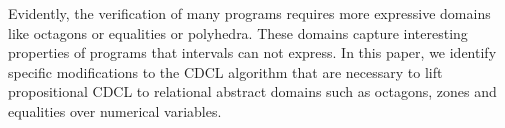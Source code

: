Evidently, the verification of many programs requires more expressive
domains like octagons or equalities or polyhedra.  These domains capture
interesting properties of programs that intervals can not express.  In this
paper, we identify specific modifications to the CDCL algorithm that are
necessary to lift propositional CDCL to relational abstract domains such as
octagons, zones and equalities over numerical variables.

